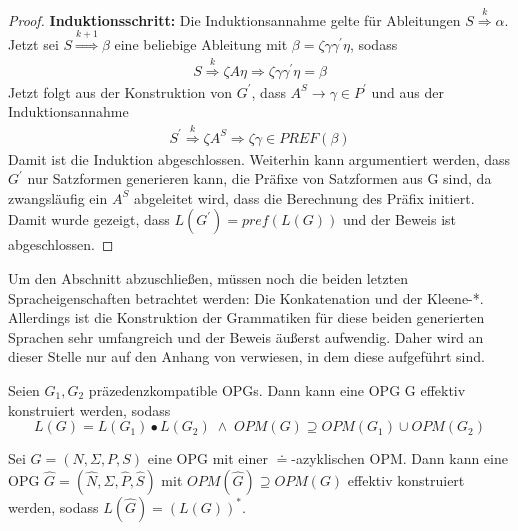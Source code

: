 \begin{proof}
\textbf{Induktionsschritt:}
Die Induktionsannahme gelte für Ableitungen $S \stackrel{k}{\Rightarrow} \alpha$. Jetzt sei $S \stackrel{k+1}{\Rightarrow} \beta$ eine beliebige Ableitung mit $\beta=\zeta \gamma \gamma^\prime \eta$, sodass \begin{align*}
S \stackrel{k}{\Rightarrow} \zeta A \eta \Rightarrow \zeta \gamma \gamma^\prime \eta = \beta
\end{align*}
Jetzt folgt aus der Konstruktion von $G^\prime$, dass $A^S \rightarrow \gamma \in P^\prime$ und aus der Induktionsannahme 
\begin{align*}
S^\prime \stackrel{k}{\Rightarrow} \zeta A^S \Rightarrow \zeta \gamma \in PREF(\beta)
\end{align*}
Damit ist die Induktion abgeschlossen.
Weiterhin kann argumentiert werden, dass $G^\prime$ nur Satzformen generieren kann, die Präfixe von Satzformen aus G sind, da zwangsläufig ein $A^S$ abgeleitet wird, dass die Berechnung des Präfix initiert.
Damit wurde gezeigt, dass $L(G^\prime) = pref(L(G))$ und der Beweis ist abgeschlossen.
\end{proof}

Um den Abschnitt abzuschließen, müssen noch die beiden letzten Spracheigenschaften betrachtet werden: Die Konkatenation und der Kleene-*. Allerdings ist die Konstruktion der Grammatiken für diese beiden generierten Sprachen sehr umfangreich und der Beweis äußerst aufwendig. Daher wird an dieser Stelle nur auf den Anhang von \cite{op_vpl_property} verwiesen, in dem diese aufgeführt sind.

\begin{theorem}[Konkatenation]
Seien $G_1, G_2$ präzedenzkompatible OPGs. Dann kann eine OPG G effektiv konstruiert werden, sodass
\begin{equation*}
L(G)=L(G_1)\bullet L(G_2) \; \wedge \; OPM(G)\supseteq OPM(G_1) \cup OPM(G_2)
\end{equation*}
\end{theorem}

\begin{theorem}[Kleene-*]
Sei $G=(N, \Sigma, P, S)$ eine OPG mit einer $\doteq$-azyklischen OPM. Dann kann eine OPG $\hat{G}=(\hat{N}, \Sigma, \hat{P}, \hat{S})$ mit $OPM(\hat{G}) \supseteq OPM(G)$ effektiv konstruiert werden, sodass $L(\hat{G})=(L(G))^*$.
\end{theorem}

